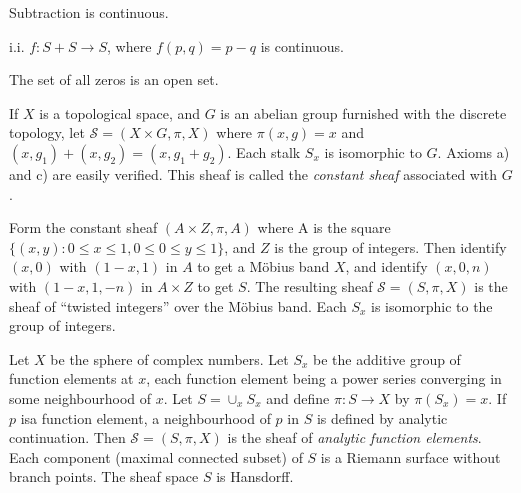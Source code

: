 \begin{corollary}%
Subtraction is continuous.
\end{corollary}

\noindent
i.i. $f:S + S \to S$, where $f(p,q)=p-q$ is continuous.

\begin{corollary}\label{chap1:cor2}
 The set of all zeros is an open set.
\end{corollary}

\begin{exam}%
If $X$ is a topological space, and $G$ is an abelian group furnished
with the discrete topology, let $\mathscr{S}= (X \times G, \pi, X)$
where $\pi(x,g)=x$ and $(x,g_1)+(x,g_2)= (x,g_1 + g_2)$. Each stalk
$S_x$ is isomorphic to $G$. Axioms a) and c) are easily
verified. This sheaf is called the \textit{constant sheaf} associated
with $G$. 
\end{exam}

\begin{exam}\label{chap1:exam2}%
Form the constant sheaf $(A \times Z, \pi , A)$ where A is the square 
$\{ (x,y): 0 \leq x \leq 1, 0 \leq 0 \leq y \leq 1 \}$, and $Z$ is the
group of integers. Then identify $(x,0)$ with $(1-x,1)$ in $A$ to get
a M\"obius band $X$, and identify $(x,0,n)$ with $(1-x,1, -n)$ in $A
\times Z$ to get $S$. The resulting sheaf $\mathscr{S}=(S, \pi , X)$
is the sheaf of ``twisted integers'' over the M\"obius band. Each $S_x$ is
isomorphic to the group of integers. 
\end{exam}

\medskip
\begin{exam}\label{chap1:exam3}%
Let $X$ be the sphere of complex numbers. Let $S_x$ be the additive
group of function elements at $x$, each function element being a power
series converging in some neighbourhood of $x$. Let $S = \cup_x S_x$
and define $\pi : S \to X$ by $\pi(S_x) =x$. If $p$ is\pageoriginale a function
element, a neighbourhood of $p$ in $S$ is defined by analytic
continuation. Then $\mathscr{S}= (S, \pi, X)$ is the sheaf of \textit{
  analytic function elements}. Each component (maximal connected
subset) of $S$ is a Riemann surface without branch points. The sheaf
space $S$ is Hansdorff.  
\end{exam}
